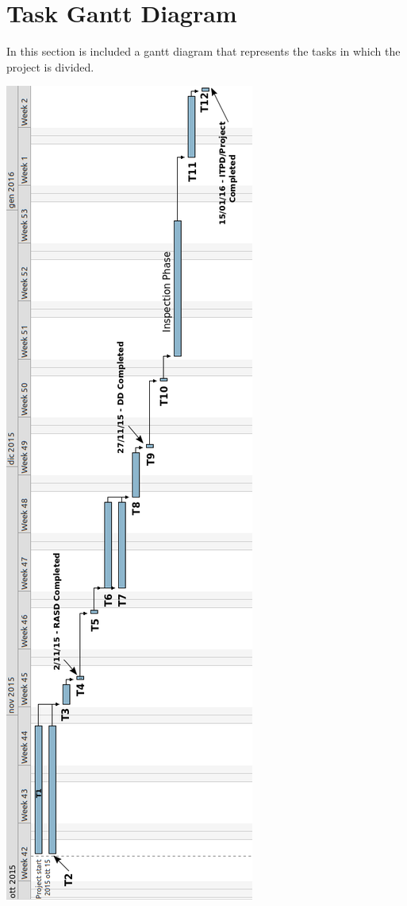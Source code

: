 \documentclass[11pt,titlepage]{article} %
\begin{document}
\section{Task Gantt Diagram}
 In this section is included a gantt diagram that represents the tasks in which the project is divided.\newline
 \begin{center}
  \includegraphics[scale=0.4]{gantt.png}
 \end{center}
\newpage
\end{document}
